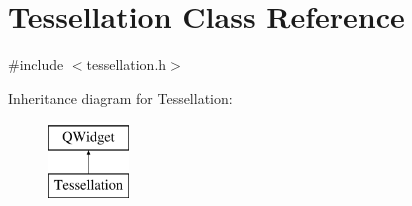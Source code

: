 \hypertarget{class_tessellation}{}\section{Tessellation Class Reference}
\label{class_tessellation}


{\ttfamily \#include $<$tessellation.\+h$>$}

Inheritance diagram for Tessellation\+:\begin{figure}[H]
\begin{center}
\leavevmode
\includegraphics[height=2.000000cm]{class_tessellation}
\end{center}
\end{figure}
